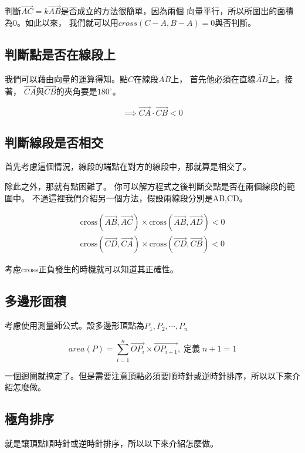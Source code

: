     判斷$\overrightarrow{AC}= k \overrightarrow{AB}$是否成立的方法很簡單，因為兩個
    向量平行，所以所圍出的面積為$0$。如此以來，
    我們就可以用$cross(C-A,B-A)=0$與否判斷。

    \subsection{判斷點是否在線段上}
    我們可以藉由向量的運算得知。點$C$在線段$\overline{AB}$上，
    首先他必須在直線$\overleftrightarrow{AB}$上。接著，
    $\overrightarrow{CA}$與$\overrightarrow{CB}$的夾角要是$180^{\circ}$。

    $$\implies \overrightarrow{CA} \cdot \overrightarrow{CB} < 0$$

    \subsection{判斷線段是否相交}
    首先考慮這個情況，線段的端點在對方的線段中，那就算是相交了。

    除此之外，那就有點困難了。
    你可以解方程式之後判斷交點是否在兩個線段的範圍中。
    不過這裡我們介紹另一個方法，假設兩線段分別是AB,CD。

    \begin{align*}
        \text{cross}(\overrightarrow{AB}, \overrightarrow{AC}) \times \text{cross}(\overrightarrow{AB}, \overrightarrow{AD}) < 0 \\
        \text{cross}(\overrightarrow{CD}, \overrightarrow{CA}) \times \text{cross}(\overrightarrow{CD}, \overrightarrow{CB}) < 0
    \end{align*}

    考慮cross正負發生的時機就可以知道其正確性。

    \subsection{多邊形面積}
    考慮使用測量師公式。設多邊形頂點為$P_1,P_2, \cdots, P_n$

    $$area(P)=\sum_{i=1}^{n}\overrightarrow{OP_i}  \times \overrightarrow{OP_{i+1}}, \; 定義 \; n+1=1$$

    一個迴圈就搞定了。但是需要注意頂點必須要順時針或逆時針排序，所以以下來介紹怎麼做。

    \subsection{極角排序}
    就是讓頂點順時針或逆時針排序，所以以下來介紹怎麼做。

